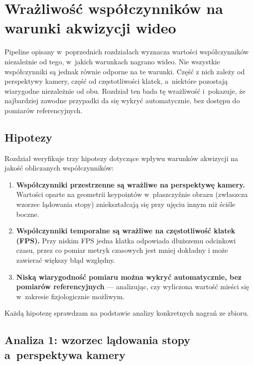 \chapter{Wrażliwość współczynników na warunki akwizycji wideo}
\label{ch:wrazliwosc}

Pipeline opisany w~poprzednich rozdziałach wyznacza wartości współczynników niezależnie od tego, w~jakich warunkach nagrano wideo. Nie wszystkie współczynniki są jednak równie odporne na te warunki. Część z nich zależy od perspektywy kamery, część od częstotliwości klatek, a~niektóre pozostają wiarygodne niezależnie od obu. Rozdział ten bada tę wrażliwość i~pokazuje, że najbardziej zawodne przypadki da się wykryć automatycznie, bez dostępu do pomiarów referencyjnych.

\section{Hipotezy}
\label{sec:hipotezy-p3}

Rozdział weryfikuje trzy hipotezy dotyczące wpływu warunków akwizycji na jakość obliczanych współczynników:

\begin{enumerate}
    \item \textbf{Współczynniki przestrzenne są wrażliwe na perspektywę kamery.} Wartości oparte na geometrii keypointów w~płaszczyźnie obrazu (zwłaszcza wzorzec lądowania stopy) zniekształcają się przy ujęciu innym niż ściśle boczne.
    \item \textbf{Współczynniki temporalne są wrażliwe na częstotliwość klatek (FPS).} Przy niskim FPS jedna klatka odpowiada dłuższemu odcinkowi czasu, przez co pomiar metryk czasowych jest mniej dokładny i może zawierać większy błąd względny.

    \item \textbf{Niską wiarygodność pomiaru można wykryć automatycznie, bez pomiarów referencyjnych} --- analizując, czy wyliczona wartość mieści się w~zakresie fizjologicznie możliwym.
\end{enumerate}

Każdą hipotezę sprawdzam na podstawie analizy konkretnych nagrań ze zbioru.


\section{Analiza 1: wzorzec lądowania stopy a~perspektywa kamery}
\label{sec:case1-foot-strike}

